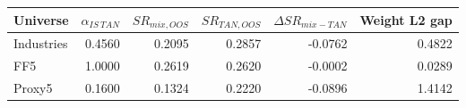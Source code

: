 \begin{tabular}{lrrrrr}
\toprule
Universe & $\alpha_{IS\ TAN}$ & $SR_{mix,OOS}$ & $SR_{TAN,OOS}$ & $\Delta SR_{mix-TAN}$ & Weight L2 gap \\
\midrule
Industries & 0.4560 & 0.2095 & 0.2857 & -0.0762 & 0.4822 \\
FF5 & 1.0000 & 0.2619 & 0.2620 & -0.0002 & 0.0289 \\
Proxy5 & 0.1600 & 0.1324 & 0.2220 & -0.0896 & 1.4142 \\
\bottomrule
\end{tabular}
